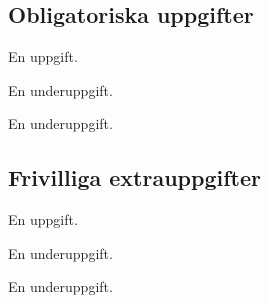 

\subsection{Obligatoriska uppgifter}

\Task En uppgift.

\Subtask En underuppgift.

\Subtask En underuppgift.

\subsection{Frivilliga extrauppgifter}

\Task En uppgift.

\Subtask En underuppgift.

\Subtask En underuppgift.

